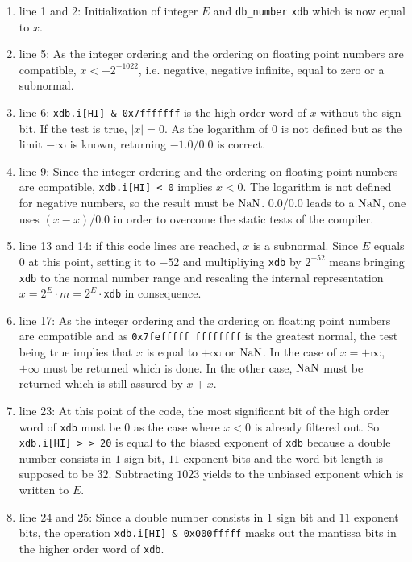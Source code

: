 {\renewcommand{\labelenumi}{}
\begin{enumerate}
\item line 1 and 2: Initialization of integer $E$ and {\tt db\_number} {\tt xdb} which is now equal to $x$.
\item line 5: As the integer ordering and the ordering on floating point numbers are compatible, 
$x < +2^{-1022}$, i.e. negative, negative infinite, equal to zero or a subnormal. 
\item line 6: {\tt xdb.i[HI] \& 0x7fffffff} is the high order word of $x$ without the sign bit. If the test is true,
$\left \vert x \right \vert = 0$. As the logarithm of $0$ is not defined but as the limit $-\infty$ is known, returning
$-1.0 / 0.0$ is correct.
\item line 9: Since the integer ordering and the ordering on floating point numbers are compatible, 
{\tt xdb.i[HI] < 0} implies $x < 0$. The logarithm is not defined for negative numbers, so the result must be $\mathrm{NaN}$. 
$0.0 / 0.0$ leads to a $\mathrm{NaN}$, one uses $\left(x - x\right) / 0.0$ in order to overcome the static tests of the compiler.
\item line 13 and 14: if this code lines are reached, $x$ is a subnormal. Since $E$ equals $0$ at this point, 
setting it to $-52$ and multipliying {\tt xdb} by $2^{-52}$ means bringing {\tt xdb} to the normal number range and
rescaling the internal representation $x = 2^E \cdot m = 2^E \cdot${\tt xdb} in consequence.
\item line 17: As the integer ordering and the ordering on floating point numbers are compatible and as 
{\tt 0x7fefffff ffffffff} is the greatest normal, the test being true implies that $x$ is equal to $+\infty$ or $\mathrm{NaN}$.
In the case of $x=+\infty$, $+\infty$ must be returned which is done. In the other case, $\mathrm{NaN}$ must be returned which is
still assured by $x + x$.
\item line 23: At this point of the code, the most significant bit of the high order word of {\tt xdb} must be $0$ as
the case where $x < 0$ is already filtered out. So {\tt xdb.i[HI] > > 20} is equal to the biased exponent of {\tt xdb} 
because a double number consists in $1$ sign bit, $11$ exponent bits and the word bit length is supposed to be $32$. 
Subtracting $1023$ yields to the unbiased exponent which is written to $E$.
\item line 24 and 25: Since a double number consists in $1$ sign bit and $11$ exponent bits, the operation 
{\tt xdb.i[HI] \& 0x000fffff} masks out the mantissa bits in the higher order word of {\tt xdb}. 

\end{enumerate}}
